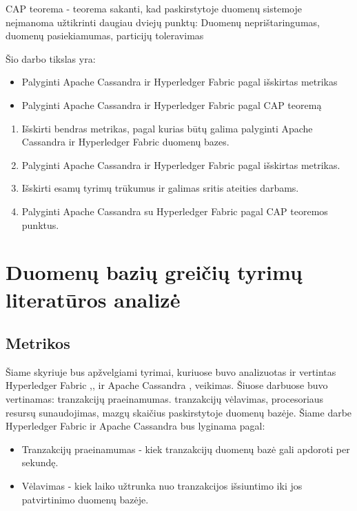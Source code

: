 \documentclass{VUMIFPSkursinis}
\begin{document}
	CAP teorema - teorema sakanti, kad paskirstytoje duomenų sistemoje neįmanoma užtikrinti daugiau dviejų punktų: Duomenų neprištaringumas, duomenų pasiekiamumas, particijų toleravimas \newline
	
	Šio darbo tikslas yra:
	\begin{itemize}
		\item{Palyginti Apache Cassandra ir Hyperledger Fabric pagal išskirtas metrikas}
		\item{Palyginti Apache Cassandra ir Hyperledger Fabric pagal CAP teoremą}
		
	\end{itemize}

	\begin{enumerate}
		\item{Išskirti bendras metrikas, pagal kurias būtų galima palyginti Apache Cassandra ir Hyperledger Fabric duomenų bazes.}
		\item{Palyginti Apache Cassandra ir Hyperledger Fabric pagal išskirtas metrikas.}
		\item{Išskirti esamų tyrimų trūkumus ir galimas sritis ateities darbams.}
		\item{Palyginti Apache Cassandra su Hyperledger Fabric pagal CAP teoremos punktus.}
		
	\end{enumerate}
\pagebreak
\section{Duomenų bazių greičių tyrimų literatūros analizė}

	\subsection{Metrikos}
		Šiame skyriuje bus apžvelgiami tyrimai, kuriuose buvo analizuotas ir vertintas Hyperledger Fabric \cite{IMBResearch},\cite{ThailandPerf},\cite{ShaFabPerf} ir Apache Cassandra \cite{BITCass},\cite{MonCas} veikimas. 
		Šiuose darbuose buvo vertinamas: tranzakcijų praeinamumas. tranzakcijų vėlavimas, procesoriaus resursų sunaudojimas, mazgų skaičius paskirstytoje duomenų bazėje. \newline
		Šiame darbe Hyperledger Fabric ir Apache Cassandra bus lyginama pagal:
		\begin{itemize}
			\item{Tranzakcijų praeinamumas - kiek tranzakcijų duomenų bazė gali apdoroti per sekundę.}
			\item{Vėlavimas - kiek laiko užtrunka nuo tranzakcijos išsiuntimo iki jos patvirtinimo duomenų bazėje.}
		\end{itemize}
\end{document}
